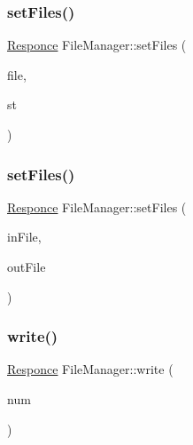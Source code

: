 \subsubsection{\texorpdfstring{set\+Files()}{setFiles()}\hspace{0.1cm}{\footnotesize\ttfamily [1/2]}}
{\footnotesize\ttfamily \hyperlink{_structures_8h_a9864d6ef28dd6e38416afac4426b3491}{Responce} File\+Manager\+::set\+Files (\begin{DoxyParamCaption}\item[{string}]{file,  }\item[{\hyperlink{_structures_8h_a57306ae0f9e356347388234ed69e0ce7}{File\+State}}]{st }\end{DoxyParamCaption})}

\hypertarget{class_file_manager_a975bf0088fa67c83d78ec54b9f61a473}{}\label{class_file_manager_a975bf0088fa67c83d78ec54b9f61a473} 
\subsubsection{\texorpdfstring{set\+Files()}{setFiles()}\hspace{0.1cm}{\footnotesize\ttfamily [2/2]}}
{\footnotesize\ttfamily \hyperlink{_structures_8h_a9864d6ef28dd6e38416afac4426b3491}{Responce} File\+Manager\+::set\+Files (\begin{DoxyParamCaption}\item[{string}]{in\+File,  }\item[{string}]{out\+File }\end{DoxyParamCaption})}

\hypertarget{class_file_manager_a77cb9ec2885923dd6b7a9674cb75f85f}{}\label{class_file_manager_a77cb9ec2885923dd6b7a9674cb75f85f} 
\subsubsection{\texorpdfstring{write()}{write()}\hspace{0.1cm}{\footnotesize\ttfamily [1/2]}}
{\footnotesize\ttfamily \hyperlink{_structures_8h_a9864d6ef28dd6e38416afac4426b3491}{Responce} File\+Manager\+::write (\begin{DoxyParamCaption}\item[{long long}]{num }\end{DoxyParamCaption})}

